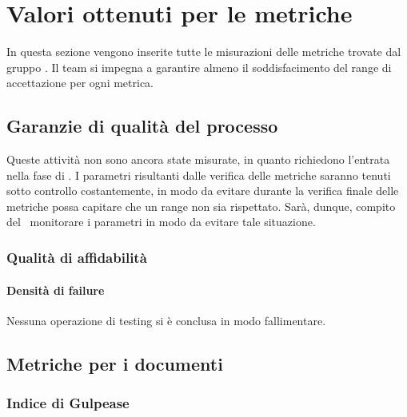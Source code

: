 \section{Valori ottenuti per le metriche}

In questa sezione vengono inserite tutte le misurazioni delle metriche trovate dal gruppo \gruppo.
Il team si impegna a garantire almeno il soddisfacimento del range di accettazione per ogni metrica.


\subsection{Garanzie di qualità del processo}

Queste attività non sono ancora state misurate, in quanto richiedono l'entrata nella fase di \COD. I parametri risultanti dalle verifica delle metriche saranno tenuti sotto controllo costantemente, in modo da evitare durante la verifica finale delle metriche possa capitare che un range non sia rispettato. Sarà, dunque, compito del \Ver\ monitorare i parametri in modo da evitare tale situazione.

\subsubsection{Qualità di affidabilità}

\paragraph{Densità di failure}

Nessuna operazione di testing si è conclusa in modo fallimentare.

\subsection{Metriche per i documenti}

\subsubsection{Indice di Gulpease}

